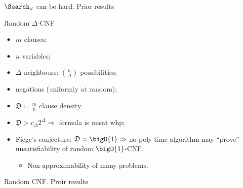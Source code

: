 \begin{frame}{$\Search_{\varphi}$ can be hard. Prior results}
    
\end{frame}


\begin{frame}{Random $\Delta$-CNF}

    \begin{minipage}{0.38\linewidth}
        \centering
        
    \end{minipage}
    \begin{minipage}{0.58\linewidth}
        \begin{itemize}
            \item $m$ clauses;
            \item $n$ variables;
            \item $\Delta$ neighbours: $\binom{n}{\Delta}$ possibilities;
            \item negations (uniformly at random);
            \item $\mathfrak{D} \coloneqq \frac{m}{n}$ clause density.
        \end{itemize}
    \end{minipage}

    \pause
    \begin{itemize}
        \item $\mathfrak{D} > c_{\Delta} 2^{\Delta} \Rightarrow$ formula is unsat whp;
            \pause
        \item Fiege's conjecture: $\mathfrak{D} = \bigO{1} \Rightarrow$ no poly-time algorithm may
            ``prove'' unsatisfiability of random $\bigO{1}$-CNF.
            \begin{itemize}
                \item Non-approximability of many problems.
            \end{itemize}
    \end{itemize}

\end{frame}


\begin{frame}{Random CNF. Proir results}

    \begin{center}
        
    \end{center}
\end{frame}